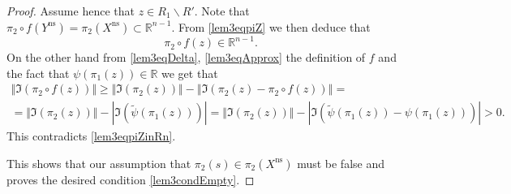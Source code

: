 \documentclass{amsart}
\theoremstyle{plain}
\theoremstyle{definition}
\theoremstyle{remark}
\numberwithin{equation}{thm} %
\newcommand{\R}{\mathbb{R}}
\newcommand{\ns}{\mathrm{ns}}
\begin{document}
\begin{proof}
Assume hence that $z\in R_1\backslash R'$. Note that $\pi_2\circ f(Y^\ns)=\pi_2(X^\ns)\subset \R^{n-1}$. From \eqref{lem3eqpiZ} we then deduce that
\begin{equation}\label{lem3eqpiZinRn}
    \pi_2\circ f(z)\in \R^{n-1}.
\end{equation}
On the other hand from \eqref{lem3eqDelta}, \eqref{lem3eqApprox} the definition of $f$ and the fact that $\psi(\pi_1(z))\in \R$ we get that
\begin{multline*}
    \Vert\Im(\pi_2\circ f(z))\Vert\geq \Vert \Im(\pi_2(z))\Vert - \left\Vert \Im\left(\pi_2(z)-\pi_2\circ f(z)\right)\right\Vert = \\
    = \Vert \Im(\pi_2(z))\Vert -\left|\Im\left(\tilde \psi(\pi_1(z))\right)\right|=\Vert \Im(\pi_2(z))\Vert -\left|\Im\left(\tilde \psi(\pi_1(z))-\psi(\pi_1(z))\right)\right|>0.
\end{multline*}
This contradicts \eqref{lem3eqpiZinRn}.

This shows that our assumption that $\pi_2(s)\in \pi_2(X^\ns)$ must be false and proves the desired condition \eqref{lem3condEmpty}.
\end{proof}
\end{document}
